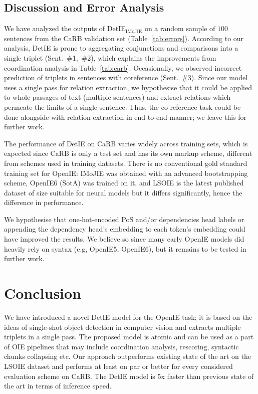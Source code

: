 \documentclass[letterpaper]{article} \usepackage{aaai22}  \usepackage{times}  \usepackage{helvet}  \usepackage{courier}  \usepackage[hyphens]{url}  \usepackage{graphicx} \usepackage{placeins}
\begin{document}
\subsection{Discussion and Error Analysis}\label{ssec:discussion}

We have analyzed the outputs of DetIE$_{\mathrm{IMoJIE}}$ on a random sample of $100$ sentences from the CaRB validation set (Table~\ref{tab:errors}). According to our analysis, DetIE is prone to aggregating conjunctions and comparisons into a single triplet (Sent.~\#1,~\#2), which explains the improvements from coordination analysis in Table~\ref{tab:carb}. Occasionally, we observed incorrect prediction of triplets in sentences with coreference (Sent.~\#3).
Since our model uses a single pass for relation extraction, we hypothesise that it could be applied to whole passages of text (multiple sentences) and extract relations which permeate the limits of a single sentence. Thus, the co-reference task could be done alongside with relation extraction in end-to-end manner; we leave this for further work.

The performance of DetIE on CaRB varies widely across training sets, which is expected since CaRB is only a test set and has its own markup scheme, different from schemes used in training datasets. There is no conventional gold standard training set for OpenIE: IMoJIE was obtained with an advanced bootstrapping scheme, OpenIE6 (SotA) was trained on it, and LSOIE is the latest published dataset of size suitable for neural models but it differs significantly, hence the difference in performance.

We hypothesise that one-hot-encoded PoS and/or dependencies head labels or appending the dependency head’s embedding to each token’s embedding could have improved the results. We believe so since many early OpenIE models did heavily rely on syntax (e.g, OpenIE5, OpenIE6), but it remains to be tested in further work.

\section{Conclusion}\label{sec:conclusion}

We have introduced a novel DetIE model for the OpenIE task; it is based on the ideas of single-shot object detection in computer vision and extracts multiple triplets in a single pass. The proposed model is atomic and can be used as a part of OIE pipelines that may include coordination analysis, rescoring, syntactic chunks collapsing etc. Our approach outperforms existing state of the art on the LSOIE dataset and performs at least on par or better for every considered evaluation scheme on CaRB.
The DetIE model is 5x faster than previous state of the art in terms of inference speed.
\end{document}
